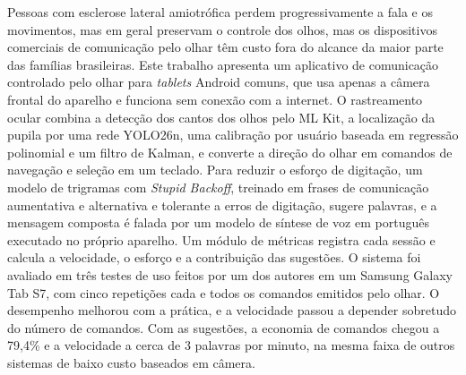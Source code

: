 Pessoas com esclerose lateral amiotrófica perdem progressivamente a fala e os movimentos, mas em geral preservam o controle dos olhos, mas os dispositivos comerciais de comunicação pelo olhar têm custo fora do alcance da maior parte das famílias brasileiras. Este trabalho apresenta um aplicativo de comunicação controlado pelo olhar para \textit{tablets} Android comuns, que usa apenas a câmera frontal do aparelho e funciona sem conexão com a internet. O rastreamento ocular combina a detecção dos cantos dos olhos pelo ML Kit, a localização da pupila por uma rede YOLO26n, uma calibração por usuário baseada em regressão polinomial e um filtro de Kalman, e converte a direção do olhar em comandos de navegação e seleção em um teclado. Para reduzir o esforço de digitação, um modelo de trigramas com \textit{Stupid Backoff}, treinado em frases de comunicação aumentativa e alternativa e tolerante a erros de digitação, sugere palavras, e a mensagem composta é falada por um modelo de síntese de voz em português executado no próprio aparelho. Um módulo de métricas registra cada sessão e calcula a velocidade, o esforço e a contribuição das sugestões. O sistema foi avaliado em três testes de uso feitos por um dos autores em um Samsung Galaxy Tab S7, com cinco repetições cada e todos os comandos emitidos pelo olhar. O desempenho melhorou com a prática, e a velocidade passou a depender sobretudo do número de comandos. Com as sugestões, a economia de comandos chegou a 79,4\% e a velocidade a cerca de 3 palavras por minuto, na mesma faixa de outros sistemas de baixo custo baseados em câmera.
